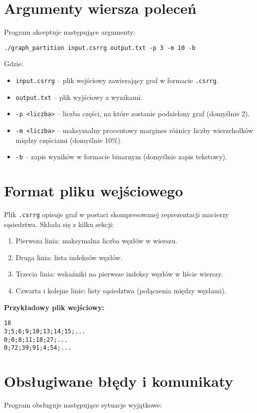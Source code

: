 \documentclass{article}
\begin{document}
\newpage
\section{Argumenty wiersza poleceń}
Program akceptuje następujące argumenty:

\begin{verbatim}
./graph_partition input.csrrg output.txt -p 3 -m 10 -b
\end{verbatim}

Gdzie:
\begin{itemize}
    \item \texttt{input.csrrg} – plik wejściowy zawierający graf w formacie \texttt{.csrrg}.
    \item \texttt{output.txt} – plik wyjściowy z wynikami.
    \item \texttt{-p <liczba>} – liczba części, na które zostanie podzielony graf (domyślnie 2).
    \item \texttt{-m <liczba>} – maksymalny procentowy margines różnicy liczby wierzchołków między częściami (domyślnie 10\%).
    \item \texttt{-b} – zapis wyników w formacie binarnym (domyślnie zapis tekstowy).
\end{itemize}

\section{Format pliku wejściowego}
Plik \texttt{.csrrg} opisuje graf w postaci skompresowanej reprezentacji macierzy sąsiedztwa. Składa się z kilku sekcji:
\begin{enumerate}
    \item Pierwsza linia: maksymalna liczba węzłów w wierszu.
    \item Druga linia: lista indeksów węzłów.
    \item Trzecia linia: wskaźniki na pierwsze indeksy węzłów w liście wierszy.
    \item Czwarta i kolejne linie: listy sąsiedztwa (połączenia między węzłami).
\end{enumerate}

\textbf{Przykładowy plik wejściowy:}
\begin{lstlisting}
18
3;5;6;9;10;13;14;15;...
0;0;8;11;18;27;...
0;72;39;91;4;54;...
\end{lstlisting}
\newpage
\section{Obsługiwane błędy i komunikaty}
Program obsługuje następujące sytuacje wyjątkowe:
\end{document}
